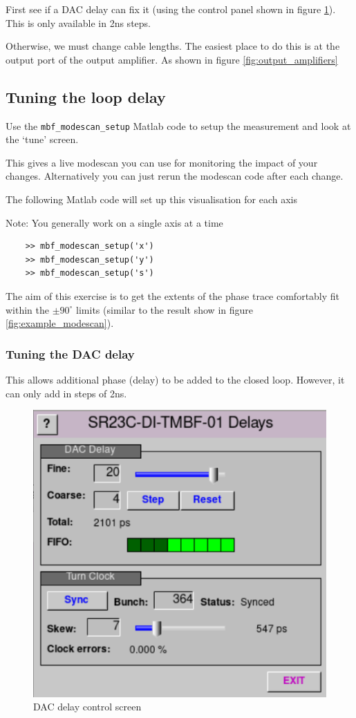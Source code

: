 \documentclass{report}
\begin{document}
First see if a DAC delay can fix it (using the control panel shown in figure \ref{fig:DAC_delay_screen}). This is only available in 2ns steps.

Otherwise, we must change cable lengths. The easiest place to do this is at the output port of the output amplifier. As shown in figure \ref{fig:output_amplifiers}
\clearpage
\subsection{Tuning the loop delay} 

Use the \verb+mbf_modescan_setup+ Matlab code to setup the measurement and look at the ‘tune’ screen. 

This gives a live modescan you can use for monitoring the impact of your changes. Alternatively you can just rerun the modescan code after each change.

The following Matlab code will set up this visualisation for each axis 

Note: You generally work on a single axis at a time 

\begin{verbatim}
    >> mbf_modescan_setup('x') 
    >> mbf_modescan_setup('y') 
    >> mbf_modescan_setup('s') 
\end{verbatim}
 
The aim of this exercise is to get the extents of the phase trace comfortably fit within the $\pm90^\circ$ limits (similar to the result show in figure \ref{fig:example_modescan}). 

\subsubsection{Tuning the DAC delay} 
This allows additional phase (delay) to be added to the closed loop. However, it can only add in steps of 2ns.
\begin{figure}[ht]
    \centering
    \includegraphics[width=0.5\linewidth]{DAC_delay.png}
    \caption{DAC delay control screen}
    \label{fig:DAC_delay_screen}
\end{figure}
\end{document}
